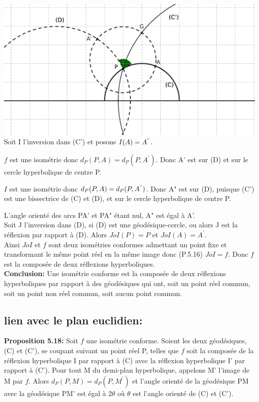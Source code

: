 \documentclass[a4paper, 12pt, twoside]{book}
\begin{document}
 

 

 \includegraphics[scale=0.7]{figures/isom7.eps}\\
 
 Soit I l'inversion dans (C') et posons $I(A)=A^{"}$. \
 
 $f$ est une isométrie donc $d_{P}(P,A)=d_{P}(P,A^{'})$. Donc A' est sur (D) et sur le cercle hyperbolique de centre P.\
 
 $I$ est une isométrie donc $d_{P}(P,A)=d_{P}(P,A^{"})$. Donc A" est sur (D), puisque (C') est une bissectrice de (C) et (D), et sur le cercle hyperbolique de centre P.\
 
 L'angle orienté des arcs PA' et PA" étant nul, A" est égal à A'.\\
 
 Soit J l'inversion dans (D), si (D) est une géodésique-cercle, ou alors J est la réflexion par rapport à (D). Alors $JoI(P)=P$ et $JoI(A)=A^{'}$. \\
 
 Ainsi $JoI$ et $f$ sont deux isométries conformes admettant un point fixe et transformant le même point réel en la même image donc (P.5.16) $JoI=f$. Donc $f$ est la composée de deux réflexions hyperboliques. \\
 
 \textbf{Conclusion:} Une isométrie conforme est la composée de deux réflexions hyperboliques par rapport à des géodésiques qui ont, soit un point réel commun, soit un point non réel commun, soit aucun point commun.\\
 
 
 \subsection{lien avec le plan euclidien:}
 
 
 \textbf{Proposition 5.18:} Soit $f$ une isométrie conforme. Soient les deux géodésiques, (C) et (C'), se coupant suivant un point réel P, telles que $f$ soit la composée de la réflexion hyperbolique I par rapport à (C) avec la réflexion hyperbolique I' par rapport à (C'). Pour tout M du demi-plan hyperbolique, appelons M' l'image de M par $f$. Alors $d_{P}(P,M)=d_{P}(P, M^{'})$ et l'angle orienté de la géodésique PM avec la géodésique PM' est égal à $2\theta$ où $\theta$ est l'angle orienté de (C) et (C').\\
 
\end{document}
